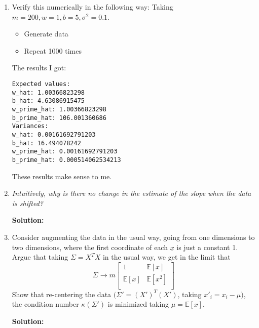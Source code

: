 \documentclass[letter, 12pt]{article}
\begin{document}
\begin{enumerate}
    	\item{Verify this numerically in the following way: Taking $ m = 200, w = 1, b = 5, \sigma^2 = 0.1 $.}
    	\begin{itemize}
    		\item Generate data
    		\item Repeat 1000 times
    	\end{itemize}
    	\par{The results I got:}
    	\begin{lstlisting}
Expected values:
w_hat: 1.00366823298
b_hat: 4.63086915475
w_prime_hat: 1.00366823298
b_prime_hat: 106.001360686
Variances:
w_hat: 0.00161692791203
b_hat: 16.494078242
w_prime_hat: 0.00161692791203
b_prime_hat: 0.000514062534213
    	\end{lstlisting}
    	\par{These results make sense to me.}
    	
    	\item{\textit{Intuitively, why is there no change in the estimate of the slope when the data is shifted?}}
    	\par{\textbf{Solution:}}
    	
    	\item{Consider augmenting the data in the usual way, going from one dimensions to two dimensions, where the first coordinate of each $ \underline{x} $ is just a constant 1. Argue that taking $ \Sigma = X^T X $ in the usual way, we get in the limit that
    	\[	\Sigma \rightarrow m
    		\begin{bmatrix}
    		1 & \mathbb{E}[x] \\
    		\mathbb{E}[x] & \mathbb{E}[x^2]\\
    		\end{bmatrix}
    	\]
    	Show that re-centering the data $ (\Sigma' = (X' )^T (X' ) $, taking $ x'_i = x_i − \mu) $, the condition number $ κ(\Sigma' ) $ is
    	minimized taking $ \mu = \mathbb{E}[x] $.
    	}
    	\par{\textbf{Solution:}}
    \end{enumerate}
\end{document}
